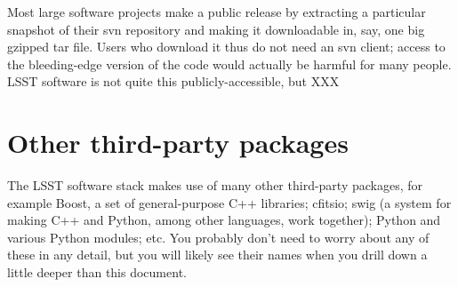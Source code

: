 \documentclass{book}
\begin{document}
Most large software projects make a public release by extracting a
particular snapshot of their svn repository and making it downloadable
in, say, one big gzipped tar file.  Users who download it thus do not
need an svn client; access to the bleeding-edge version of the code
would actually be harmful for many people.  LSST software is not quite
this publicly-accessible, but XXX

\section{Other third-party packages}

The LSST software stack makes use of many other third-party packages,
for example Boost, a set of general-purpose C++ libraries; cfitsio;
swig (a system for making C++ and Python, among other languages, work
together); Python and various Python modules; etc.  You probably don't
need to worry about any of these in any detail, but you will likely
see their names when you drill down a little deeper than this
document.

\end{document}
